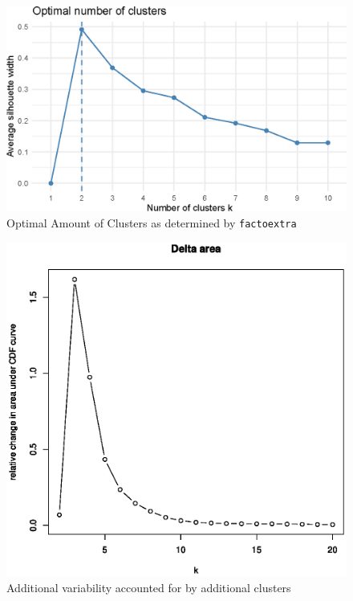 \documentclass[pdflatex,sn-mathphys]{sn-jnl}%
\theoremstyle{thmstyleone}%
\theoremstyle{thmstyletwo}%
\theoremstyle{thmstylethree}%
\begin{document}
\begin{figure}[h!]
    \centering
    \includegraphics[scale=0.6]{plots/assn3/PAM/OptimalKValues/fivek_optimalclusters.eps}
    \caption{Optimal Amount of Clusters as determined by \texttt{factoextra} \cite{factoextra}}
    \label{fig:factoextra}
\end{figure}
\begin{figure}[h!]
    \centering
    \includegraphics[scale=0.7]{plots/assn3/CCP/Top5000Genes/consensus022.eps}
    \caption{Additional variability accounted for by additional clusters}
    \label{fig:consensus}
\end{figure}
\end{document}
